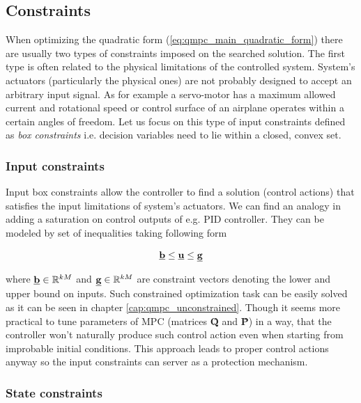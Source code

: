 \subsection{Constraints}

When optimizing the quadratic form (\ref{eq:qmpc_main_quadratic_form}) there are usually two types of constraints imposed on the searched solution. The first type is often related to the physical limitations of the controlled system. System's actuators (particularly the physical ones) are not probably designed to accept an arbitrary input signal. As for example a servo-motor has a maximum allowed current and rotational speed or control surface of an airplane operates within a certain angles of freedom. Let us focus on this type of input constraints defined as \textit{box constraints} i.e. decision variables need to lie within a closed, convex set.

\subsubsection{Input constraints}

Input box constraints allow the controller to find a solution (control actions) that satisfies the input limitations of system's actuators. We can find an analogy in adding a saturation on control outputs of e.g. PID controller. They can be modeled by set of inequalities taking following form

\begin{equation}
\begin{split}
\textbf{\underline{b}} \leq \textbf{\underline{u}} \leq \textbf{\underline{g}}
\end{split}
\label{eq:qmpc_input_constraints}
\end{equation}

where $\textbf{\underline{b}} \in \mathbb{R}^{kM}$ and $\textbf{\underline{g}} \in \mathbb{R}^{kM}$ are constraint vectors denoting the lower and upper bound on inputs. Such constrained optimization task can be easily solved as it can be seen in chapter \ref{cap:qmpc_unconstrained}. Though it seems more practical to tune parameters of MPC (matrices \textbf{\^Q} and \textbf{\^P}) in a way, that the controller won't naturally produce such control action even when starting from improbable initial conditions. This approach leads to proper control actions anyway so the input constraints can server as a protection mechanism.

\subsubsection{State constraints}
 
